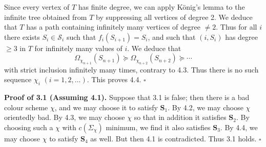 Since every vertex of $T$ has finite degree, we can apply K\"onig's lemma to the infinite tree obtained from $T$ by suppressing all vertices of degree 2. We deduce that $T$ has a path containing infinitely many vertices of degree $\ne 2$. Thus for all $i$ there exists $S_i \in \mathscr{S}_i$ such that $f_i(S_{i+1}) = S_i$, and such that $(i, S_i)$ has degree $\ge 3$ in $T$ for infinitely many values of $i$. We deduce that
\begin{equation*}
\Omega_{\chi_{n+1}}(S_{n+1}) \succcurlyeq \Omega_{\chi_{n+2}}(S_{n+2}) \succcurlyeq \cdots
\end{equation*}
with strict inclusion infinitely many times, contrary to 4.3. Thus there is no such sequence $\chi_i$ $(i = 1, 2, \dots)$. This proves 4.4. $\square$

\textbf{Proof of 3.1 (Assuming 4.1).} Suppose that 3.1 is false; then there is a bad colour scheme $\chi$, and we may choose it to satisfy $\mathbf{S}_1$. By 4.2, we may choose $\chi$ orientedly bad. By 4.3, we may choose $\chi$ so that in addition it satisfies $\mathbf{S}_2$. By choosing such a $\chi$ with $c(\Sigma_\chi)$ minimum, we find it also satisfies $\mathbf{S}_3$. By 4.4, we may choose $\chi$ to satisfy $\mathbf{S}_4$ as well. But then 4.1 is contradicted. Thus 3.1 holds. $\square$
